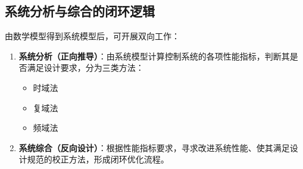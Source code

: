 \subsection{系统分析与综合的闭环逻辑}
由数学模型得到系统模型后，可开展双向工作：
\begin{enumerate}
    \item \textbf{系统分析（正向推导）}：由系统模型计算控制系统的各项性能指标，判断其是否满足设计要求，分为三类方法：
    \begin{itemize}
        \item 时域法
        \item 复域法
        \item 频域法
    \end{itemize}
    \item \textbf{系统综合（反向设计）}：根据性能指标要求，寻求改进系统性能、使其满足设计规范的校正方法，形成闭环优化流程。
\end{enumerate}

\setlength{\parskip}{0pt plus 1pt}
\renewcommand{\arraystretch}{1}
\setlength{\tabcolsep}{6pt}
